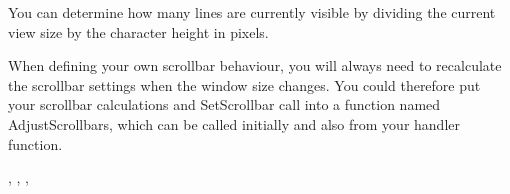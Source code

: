 You can determine how many lines are currently visible by dividing the current view
size by the character height in pixels.

When defining your own scrollbar behaviour, you will always need to recalculate
the scrollbar settings when the window size changes. You could therefore put your
scrollbar calculations and SetScrollbar
call into a function named AdjustScrollbars, which can be called initially and also
from your  handler function.


,\rtfsp
{}, ,\rtfsp
{}

\begin{comment}


\membersection{wxWindow::SetScrollPage}\label{wxwindowsetscrollpage}

\func{virtual void}{SetScrollPage}{\param{int }{orientation}, \param{int }{pageSize}, \param{bool }{refresh = {\tt true}}}

Sets the page size of one of the built-in scrollbars.

\wxheading{Parameters}

\docparam{orientation}{Determines the scrollbar whose page size is to be set. May be wxHORIZONTAL or wxVERTICAL.}

\docparam{pageSize}{Page size in scroll units.}

\docparam{refresh}{{\tt true} to redraw the scrollbar, {\tt false} otherwise.}

\wxheading{Remarks}

The page size of a scrollbar is the number of scroll units that the scroll thumb travels when you
click on the area above/left of or below/right of the thumb. Normally you will want a whole visible
page to be scrolled, i.e. the size of the current view (perhaps the window client size). This
value has to be adjusted when the window is resized, since the page size will have changed.

In addition to specifying how far the scroll thumb travels when paging, in Motif and some versions of Windows
the thumb changes size to reflect the page size relative to the length of the document. When the
document size is only slightly bigger than the current view (window) size, almost all of the scrollbar
will be taken up by the thumb. When the two values become the same, the scrollbar will (on some systems)
disappear.

Currently, this function should be called before SetPageRange, because of a quirk in the Windows
handling of pages and ranges.

\wxheading{See also}

\helpref{wxWindow::SetScrollPos}{wxwindowsetscrollpos},\rtfsp
\helpref{wxWindow::GetScrollPos}{wxwindowgetscrollpos},\rtfsp
\helpref{wxWindow::GetScrollPage}{wxwindowgetscrollpage},\rtfsp
\helpref{wxScrollBar}{wxscrollbar}, \helpref{wxScrolledWindow}{wxscrolledwindow}
\end{comment}


